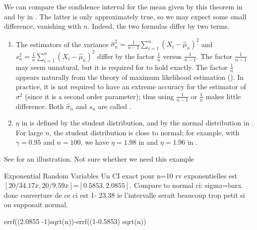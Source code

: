 We can compare the confidence interval for the
mean given by this theorem in  and
by  in . The
latter is only approximately true, so we may
expect some small difference, vanishing with $n$.
Indeed, the two formulas differ by two terms.
\noitemsep
\begin{enumerate}
    \item The estimators of the variance $\hat{\sigma}_n^2= \frac{1}{n-1}\sum_{i=1}^n \left(X_i-
 \hat{\mu}_n\right)^2$ and $s_n^2=\frac{1}{n}\sum_{i=1}^n \left(X_i-
 \hat{\mu}_n\right)^2$ differ by the factor
$\frac{1}{n}$ versus $\frac{1}{n-1}$. The factor
$\frac{1}{n-1}$ may seem unnatural, but it is
required for  to hold
exactly. The factor $\frac{1}{n}$ appears
naturally from the theory of maximum likelihood
estimation (). In practice, it
is not required to have an extreme accuracy for
the estimator of $\sigma^2$ (since it is a second
order parameter); thus using $\frac{1}{n-1}$ or
$\frac{1}{n}$ makes little difference. Both
$\hat{\sigma}_n$ and $s_n$ are called .
    \item $\eta$ in  is defined by the student distribution, and by the normal
     distribution in . For large
     $n$, the student distribution is close to
     normal; for example, with $\gamma=0.95$ and
     $n=100$, we have $\eta=1.98$ in
      and $\eta=1.96$ in
     .
\end{enumerate} See  for an
illustration.
%
%
\ifnfs Not sure whether we need this example
\begin{ex}{Exponential Random Variables}
 Un CI exact pour n=10 rv exponentielles est $[20/34.17 \bar{x},
20/9.59 \bar{x}]$=$[0.5853, 2.0855]$. Compare to normal ci:
sigma=barx donc couverture de ce ci est 1- 23.38%
 ie l'intervalle serait beaucoup trop petit si on supposait
 normal.

errf((2.0855 -1)sqrt(n))-errf((1-0.5853) sqrt(n))
\end{ex}
\fi
%
%

\begin{figure}
%
%
\end{figure}
